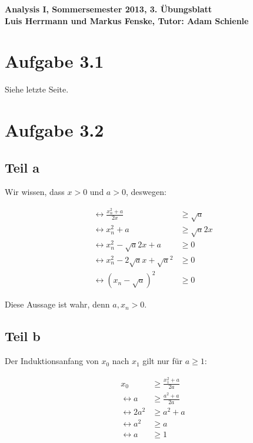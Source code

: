 \documentclass[a4paper,german,12pt,smallheadings]{scrartcl}
\begin{document}
\begin{center}
\bfseries %
\sffamily %
\vspace{-40pt}
Analysis I, Sommersemester 2013, 3. Übungsblatt \\
Luis Herrmann und Markus Fenske, Tutor: Adam Schienle
\vspace{-10pt}
\end{center}

\section*{Aufgabe 3.1}

Siehe letzte Seite.

\section*{Aufgabe 3.2}
\subsection*{Teil a}
Wir wissen, dass $x > 0$ und $a > 0$, deswegen:

\begin{align*}
  \leftrightarrow \frac{x_n^2 + a}{2x} &\ge \sqrt{a} \\
  \leftrightarrow x_n^2 + a &\ge \sqrt{a}2x \\
  \leftrightarrow x_n^2 -\sqrt{a}2x+ a &\ge 0 \\
  \leftrightarrow x_n^2 - 2\sqrt{a}x+ \sqrt{a}^2 &\ge 0 \\
  \leftrightarrow (x_n - \sqrt{a})^2 &\ge 0
\end{align*}

Diese Aussage ist wahr, denn $a,x_n > 0$.

\subsection*{Teil b}
Der Induktionsanfang von $x_0$ nach $x_1$ gilt nur für $a \ge 1$:

\begin{align*}
  x_0 &\ge \frac{x_1^2 + a}{2a} \\
  \leftrightarrow a &\ge \frac{a^2 + a}{2a} \\
  \leftrightarrow 2a^2 &\ge a^2 + a \\
  \leftrightarrow a^2 &\ge a \\
  \leftrightarrow a &\ge 1
\end{align*}
\end{document}
